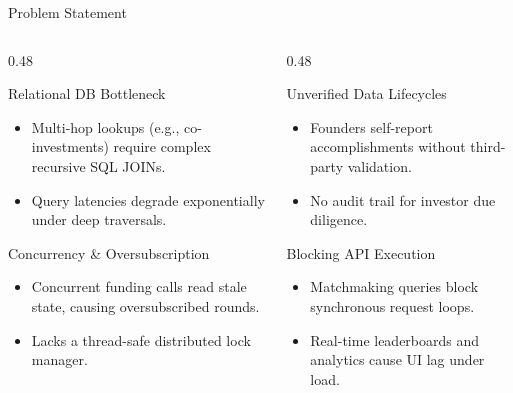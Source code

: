 \documentclass[aspectratio=169, 10pt]{beamer}
\begin{document}
\begin{frame}[plain]
  \titlepage
\end{frame}

\begin{frame}{Problem Statement}
  \begin{columns}[T]
    \begin{column}{0.48\textwidth}
      \begin{scard}{Relational DB Bottleneck}
        \begin{itemize}\setlength{\itemsep}{0.5pt}
          \item Multi-hop lookups (e.g., co-investments) require complex recursive SQL JOINs.
          \item Query latencies degrade exponentially under deep traversals.
        \end{itemize}
      \end{scard}
      \vspace{0.8mm}
      \begin{scard}{Concurrency \& Oversubscription}
        \begin{itemize}\setlength{\itemsep}{0.5pt}
          \item Concurrent funding calls read stale state, causing oversubscribed rounds.
          \item Lacks a thread-safe distributed lock manager.
        \end{itemize}
      \end{scard}
    \end{column}
    \begin{column}{0.48\textwidth}
      \begin{scard}{Unverified Data Lifecycles}
        \begin{itemize}\setlength{\itemsep}{0.5pt}
          \item Founders self-report accomplishments without third-party validation.
          \item No audit trail for investor due diligence.
        \end{itemize}
      \end{scard}
      \vspace{0.8mm}
      \begin{scard}{Blocking API Execution}
        \begin{itemize}\setlength{\itemsep}{0.5pt}
          \item Matchmaking queries block synchronous request loops.
          \item Real-time leaderboards and analytics cause UI lag under load.
        \end{itemize}
      \end{scard}
    \end{column}
  \end{columns}
\end{frame}
\end{document}
